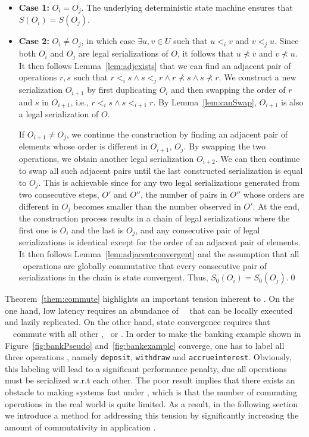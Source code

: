 \begin{itemize}

\item {\bf Case 1:} $O_i = O_j$.  The underlying deterministic state
machine ensures that $S(O_i)=S(O_j)$.

\item {\bf Case 2:} $O_i \neq O_j$, in which case $\exists u,v\in U$
such that $u<_i v$ and $v<_j u$. Since both $O_i$ and $O_j$ are
legal serializations of $O$, it follows that $u\not\prec v$ and
$v\not\prec u$. It then follows Lemma~\ref{lem:adjexists} that we
can find an adjacent pair of operations $r, s$ such
that $r<_i s \wedge s<_j r \wedge r\not\prec s \wedge s\not\prec r$. We construct a new
serialization $O_{i+1}$ by first duplicating $O_i$ and then swapping the order of $r$ and $s$ in $O_{i+1}$, 
i.e., $r<_i s \wedge s<_{i+1} r$. By Lemma~\ref{lem:canSwap}, $O_{i+1}$ is 
also a legal serialization of $O$.

If $O_{i+1} \neq O_j$, we continue the construction by finding 
an adjacent pair of elements whose order is different in $O_{i+1}$, $O_j$. By swapping
the two operations, we obtain another legal serialization $O_{i+2}$. We can then continue to swap
all such adjacent pairs until the last constructed serialization
is equal to $O_j$. This is achievable since 
for any two legal serializations generated from two consecutive steps, $O'$ and $O''$,
the number of pairs in $O''$ whose orders
are different in $O_j$ becomes smaller than the number observed in $O'$.
At the end, the construction process results in a chain of legal
serializations where the first one is $O_i$ and the last is $O_j$, and any consecutive pair of legal serializations
is identical except for the order of an adjacent pair of elements. It then follows 
Lemma~\ref{lem:adjacentconvergent} and the assumption that
all \blue\ operations are globally commutative that every consecutive pair of
serializations in the chain is state convergent. Thus, $S_0(O_i)=S_0(O_j)$.\qed
\end{itemize}

Theorem~\ref{them:commute} highlights an important tension inherent to \RBc. On the one hand,
low latency requires an abundance of \blue\ \operations\ that can be
locally executed and lazily replicated. On the other hand, state
convergence requires that \blue\ \operations\ commute with all other
\operations, \blue\ or \red. In order to make the banking
example shown in Figure~\ref{fig:bankPseudo} and~\ref{fig:bankexample} converge, one has to label all three
operations \red, namely {\tt deposit}, {\tt withdraw} and {\tt accrueinterest}.
Obviously, this labeling will lead to a significant performance penalty, due
all operations must be serialized w.r.t each other. The poor result
implies that there exists an obstacle to making systems fast under \RBCN, which
is that the number of commuting operations in the real world is quite limited. 
As a result, in the following section
we introduce a method for addressing this tension by significantly
increasing the amount of commutativity in application \operations.
